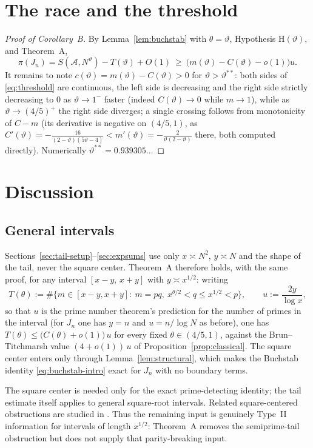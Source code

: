 \documentclass[11pt]{article}
\theoremstyle{remark}
\newcommand{\N}{N}
\newcommand{\J}{J_n}
\newcommand{\A}{\mathcal{A}}
\newcommand{\thstar}{\vartheta^{**}}
\begin{document}
\section{The race and the threshold}\label{sec:race}

\begin{proof}[Proof of Corollary~B]
By Lemma~\ref{lem:buchstab} with $\theta=\vartheta$, Hypothesis
$\mathrm{H}(\vartheta)$, and Theorem~A,
\[
\pi(\J)= S(\A,\N^{\vartheta})-T(\vartheta)+O(1)
\ \ge\ \bigl(m(\vartheta)-C(\vartheta)-o(1)\bigr)u .
\]
It remains to note $c(\vartheta)=m(\vartheta)-C(\vartheta)>0$ for
$\vartheta>\thstar$: both sides of \eqref{eq:threshold} are continuous, the left side
is decreasing and the right side strictly decreasing to $0$ as
$\vartheta\to1^-$ faster (indeed $C(\vartheta)\to0$ while $m\to1$), while as
$\vartheta\to(4/5)^+$ the right side diverges; a single crossing follows from
monotonicity of $C-m$ (its derivative is negative on $(4/5,1)$, as
$C'(\vartheta)=-\tfrac{16}{(2-\vartheta)(5\vartheta-4)}<m'(\vartheta)
=-\tfrac{2}{\vartheta(2-\vartheta)}$ there, both computed directly). Numerically
$\thstar=0.939305\ldots$
\end{proof}

\section{Discussion}\label{sec:discussion}

\subsection{General intervals}\label{sec:general}
Sections~\ref{sec:tail-setup}--\ref{sec:expsums} use only $x\asymp\N^2$, $y\asymp\N$
and the shape of the tail, never the square center. Theorem~A therefore holds, with
the same proof, for any interval $[x-y,\,x+y]$ with $y\asymp x^{1/2}$: writing
\[
T(\theta):=\#\{m\in[x-y,x+y]:\ m=pq,\ x^{\theta/2}<q\le x^{1/2}<p\},
\qquad u:=\frac{2y}{\log x},
\]
so that $u$ is the prime number theorem's prediction for the number of primes in the
interval (for $\J$ one has $y=n$ and $u=n/\log\N$ as before), one has
$T(\theta)\le\bigl(C(\theta)+o(1)\bigr)\,u$ for every fixed $\theta\in(4/5,1)$,
against the Brun--Titchmarsh value $(4+o(1))\,u$ of
Proposition~\ref{prop:classical}. The square center enters only through
Lemma~\ref{lem:structural}, which makes the Buchstab identity
\eqref{eq:buchstab-intro} exact for $\J$ with no boundary terms.

The square center is needed only for the exact prime-detecting identity; the tail estimate itself applies to general square-root intervals. Related square-centered obstructions are studied in \cite{RossObstruction,RossRays,RossShells}. Thus the remaining input is genuinely Type~II information for intervals of length $x^{1/2}$: Theorem~A removes the semiprime-tail obstruction but does not supply that parity-breaking input.
\end{document}
